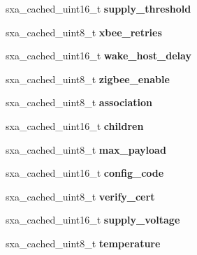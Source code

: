 \begin{DoxyCompactItemize}
sxa\+\_\+cached\+\_\+uint16\+\_\+t {\bfseries supply\+\_\+threshold}
\item 
\mbox{\label{structsxa__node__t_aaf807aaf291b79ce0e474e3bc5525e3a}} 
sxa\+\_\+cached\+\_\+uint8\+\_\+t {\bfseries xbee\+\_\+retries}
\item 
\mbox{\label{structsxa__node__t_ae6f50e937e739f9f76268cd9ada5913b}} 
sxa\+\_\+cached\+\_\+uint16\+\_\+t {\bfseries wake\+\_\+host\+\_\+delay}
\item 
\mbox{\label{structsxa__node__t_a7305c35cc7e30bf2e8f957bc632bd568}} 
sxa\+\_\+cached\+\_\+uint8\+\_\+t {\bfseries zigbee\+\_\+enable}
\item 
\mbox{\label{structsxa__node__t_a4ca0beadf74288cf8953000e9c68974f}} 
sxa\+\_\+cached\+\_\+uint8\+\_\+t {\bfseries association}
\item 
\mbox{\label{structsxa__node__t_a5242f89ec315c2686d3fbd5c9722986e}} 
sxa\+\_\+cached\+\_\+uint16\+\_\+t {\bfseries children}
\item 
\mbox{\label{structsxa__node__t_a12367fce32f52967043c0af353fa2914}} 
sxa\+\_\+cached\+\_\+uint8\+\_\+t {\bfseries max\+\_\+payload}
\item 
\mbox{\label{structsxa__node__t_ade3c4bde58c058d4c0bf3c8c253687b6}} 
sxa\+\_\+cached\+\_\+uint16\+\_\+t {\bfseries config\+\_\+code}
\item 
\mbox{\label{structsxa__node__t_ab46f86f2b69313ee4718880c9c3b3069}} 
sxa\+\_\+cached\+\_\+uint8\+\_\+t {\bfseries verify\+\_\+cert}
\item 
\mbox{\label{structsxa__node__t_a9d0f7386d38f7870566220befdb0b2ea}} 
sxa\+\_\+cached\+\_\+uint16\+\_\+t {\bfseries supply\+\_\+voltage}
\item 
\mbox{\label{structsxa__node__t_acd76a81e7c979f34f6556d30279f7a11}} 
sxa\+\_\+cached\+\_\+uint8\+\_\+t {\bfseries temperature}
\item 
\mbox{\label{structsxa__node__t_a9ad0ea06f029820d1f85b9ca75ab9eff}} 

\end{DoxyCompactItemize}
